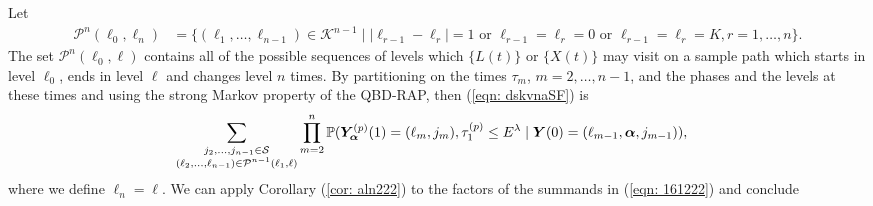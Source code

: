 Let 
\begin{align}\label{eqn: paths set1}
	\mathcal P^n(\ell_0,\ell_n)&=\{(\ell_1,\dots,\ell_{n-1}) \in \mathcal K^{n-1}\mid |\ell_{r-1}-\ell_r|=1 \mbox{ or } \ell_{r-1}=\ell_r=0 \mbox{ or } \ell_{r-1}=\ell_r=K,r = 1,\dots,n\}.
\end{align}
The set \(\mathcal P^n(\ell_0,\ell)\) contains all of the possible sequences of levels which \(\{L(t)\}\) or \(\{X(t)\}\) may visit on a sample path which starts in level \(\ell_0\), ends in level \(\ell\) and changes level \(n\) times. By partitioning on the times \(\tau_m\), \(m=2,\dots,n-1\), and the phases and the levels at these times and using the strong Markov property of the QBD-RAP, then (\ref{eqn: dskvnaSF}) is  
	\begin{align}
	 &\sum_{\substack{j_2,\dots,j_{n-1}\in\mathcal S \\ (\ell_2,\dots,\ell_{n-1}) \in\mathcal P^{n-1}(\ell_1,\ell)}}\prod_{m=2}^{n}\mathbb P(\bm{Y}_{\bm{\alpha}}^{(p)}(1) =(\ell_m, j_m), \tau_{1}^{(p)}\leq E^\lambda 
            	 \mid  
	 	\boldsymbol Y(0) = (\ell_{m-1},\boldsymbol \alpha, j_{m-1})),  \label{eqn: 161222}
\end{align}
where we define \(\ell_n=\ell\). %
We can apply Corollary (\ref{cor: aln222}) to the factors of the summands in (\ref{eqn: 161222}) and conclude 
